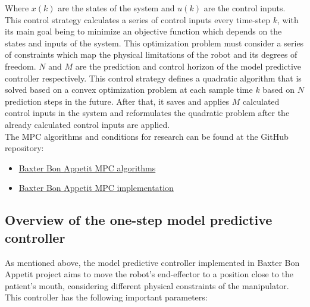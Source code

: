 \documentclass[11pt]{report} %
\begin{document}
Where $x(k)$ are the states of the system and $u(k)$ are the control inputs.\\

This control strategy calculates a series of control inputs every time-step $k$, with its main goal being to minimize an objective function which depends on the states and inputs of the system. This optimization problem must consider a series of constraints which map the physical limitations of the robot and its degrees of freedom. $N$ and $M$ are the prediction and control horizon of the model predictive controller respectively. This control strategy defines a quadratic algorithm that is solved based on a convex optimization problem at each sample time $k$ based on $N$ prediction steps in the future. After that, it saves and applies $M$ calculated control inputs in the system and reformulates the quadratic problem after the already calculated control inputs are applied.\\

The MPC algorithms and conditions for  research can be found at the GitHub repository:

\begin{itemize}
    \color{blue}
    \item \href{https://github.com/san99tiago/baxter-bon-appetit/tree/main/python/baxter_bon_appetit/src/baxter_control}{Baxter Bon Appetit MPC algorithms}
    
    \color{blue}
    \item \href{https://github.com/san99tiago/baxter-bon-appetit/blob/main/python/baxter_bon_appetit/scripts/node_mpc_control_trajectory.py}{Baxter Bon Appetit MPC implementation}
\end{itemize}


\subsection{Overview of the one-step model predictive controller}

As mentioned above, the model predictive controller implemented in Baxter Bon Appetit project aims to move the robot's end-effector to a position close to the patient's mouth, considering different physical constraints of the manipulator.\\

This controller has the following important parameters:
\end{document}
